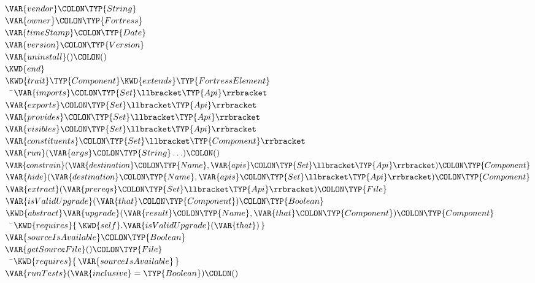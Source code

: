 \begin{Fortress}
\(  \VAR{vendor}\COLON \TYP{String}\)\\
\(  \VAR{owner}\COLON \TYP{Fortress}\)\\
\(  \VAR{timeStamp}\COLON \TYP{Date}\)\\
\(  \VAR{version}\COLON \TYP{Version}\)\\
\(  \VAR{uninstall}()\COLON ()\)\-\\\poptabs
\(\KWD{end}\)\\[4pt]
\(\KWD{trait} \TYP{Component} \KWD{extends} \TYP{FortressElement}\)\\
{\tt~~}\pushtabs\=\+\(  \VAR{imports}\COLON \TYP{Set}\llbracket\TYP{Api}\rrbracket\)\\
\(  \VAR{exports}\COLON \TYP{Set}\llbracket\TYP{Api}\rrbracket\)\\
\(  \VAR{provides}\COLON \TYP{Set}\llbracket\TYP{Api}\rrbracket\)\\
\(  \VAR{visibles}\COLON \TYP{Set}\llbracket\TYP{Api}\rrbracket\)\\
\(  \VAR{constituents}\COLON \TYP{Set}\llbracket\TYP{Component}\rrbracket\)\\
\(  \VAR{run}(\VAR{args}\COLON \TYP{String}\ldots)\COLON ()\)\\
\(  \VAR{constrain}(\VAR{destination}\COLON \TYP{Name}, \VAR{apis}\COLON \TYP{Set}\llbracket\TYP{Api}\rrbracket)\COLON \TYP{Component}\)\\
\(  \VAR{hide}(\VAR{destination}\COLON \TYP{Name}, \VAR{apis}\COLON \TYP{Set}\llbracket\TYP{Api}\rrbracket)\COLON \TYP{Component}\)\\
\(  \VAR{extract}(\VAR{prereqs}\COLON \TYP{Set}\llbracket\TYP{Api}\rrbracket)\COLON \TYP{File}\)\\
\(  \VAR{isValidUpgrade}(\VAR{that}\COLON \TYP{Component})\COLON \TYP{Boolean}\)\\
\(  \KWD{abstract} \VAR{upgrade}(\VAR{result}\COLON \TYP{Name}, \VAR{that}\COLON \TYP{Component})\COLON \TYP{Component}\)\\
{\tt~~}\pushtabs\=\+\(    \KWD{requires} \{\, \mathord{\KWD{self}}.\VAR{isValidUpgrade}(\VAR{that})\,\}\)\-\\\poptabs
\(  \VAR{sourceIsAvailable}\COLON \TYP{Boolean}\)\\
\(  \VAR{getSourceFile}()\COLON \TYP{File} \)\\
{\tt~~}\pushtabs\=\+\(    \KWD{requires} \{\, \VAR{sourceIsAvailable}\,\}\)\-\\\poptabs
\(  \VAR{runTests}(\VAR{inclusive} = \TYP{Boolean})\COLON ()\)\-\\\poptabs

\end{Fortress}
